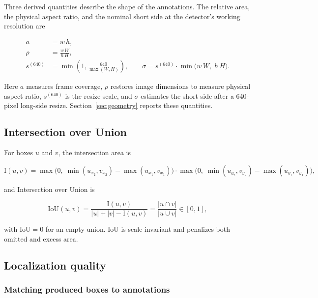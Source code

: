 \documentclass[a4paper,8pt]{article}
\begin{document}
Three derived quantities describe the shape of the annotations. The relative area, the physical
aspect ratio, and the nominal short side at the detector's working resolution are

\begin{align}
a &= w\,h, \label{eq:relarea}\\[2pt]
\rho &= \frac{w\,W}{h\,H}, \label{eq:aspect}\\[2pt]
s^{(640)} &= \min\!\left(1, \frac{640}{\max(W,H)}\right), \qquad
\sigma = s^{(640)} \cdot \min\bigl(w\,W,\; h\,H\bigr). \label{eq:shortside}
\end{align}

Here $a$ measures frame coverage, $\rho$ restores image dimensions to measure physical aspect
ratio, $s^{(640)}$ is the resize scale, and $\sigma$ estimates the short side after a
640-pixel long-side resize. Section~\ref{sec:geometry} reports these quantities.

\subsection{Intersection over Union}

For boxes $u$ and $v$, the intersection area is

\begin{equation}
\mathrm{I}(u,v) =
\max\bigl(0,\; \min(u_{x_2}, v_{x_2}) - \max(u_{x_1}, v_{x_1})\bigr) \cdot
\max\bigl(0,\; \min(u_{y_2}, v_{y_2}) - \max(u_{y_1}, v_{y_1})\bigr),
\label{eq:inter}
\end{equation}

and Intersection over Union is

\begin{equation}
\mathrm{IoU}(u,v) = \frac{\mathrm{I}(u,v)}{|u| + |v| - \mathrm{I}(u,v)}
= \frac{|u \cap v|}{|u \cup v|} \in [0,1],
\label{eq:iou}
\end{equation}

with $\mathrm{IoU}=0$ for an empty union. IoU is scale-invariant and penalizes both omitted and
excess area.

\subsection{Localization quality}
\label{sec:localization-metrics}

\subsubsection{Matching produced boxes to annotations}
\end{document}
